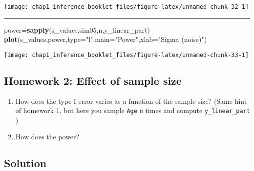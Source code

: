 \documentclass[]{article}
\newenvironment{Shaded}{\begin{snugshade}}{\end{snugshade}}
\newcommand{\KeywordTok}[1]{\textcolor[rgb]{0.13,0.29,0.53}{\textbf{#1}}}
\newcommand{\DataTypeTok}[1]{\textcolor[rgb]{0.13,0.29,0.53}{#1}}
\newcommand{\StringTok}[1]{\textcolor[rgb]{0.31,0.60,0.02}{#1}}
\newcommand{\NormalTok}[1]{#1}
\begin{document}
\begin{center}\texttt{[image: chap1\_inference\_booklet\_files/figure-latex/unnamed-chunk-32-1]} \end{center}

\begin{center}\rule{0.5\linewidth}{\linethickness}\end{center}

\begin{Shaded}
\begin{Highlighting}[]
\NormalTok{power=}\KeywordTok{sapply}\NormalTok{(s_values,sim05,n,y_linear_part)}
\KeywordTok{plot}\NormalTok{(s_values,power,}\DataTypeTok{type=}\StringTok{"l"}\NormalTok{,}\DataTypeTok{main=}\StringTok{"Power"}\NormalTok{,}\DataTypeTok{xlab=}\StringTok{"Sigma (noise)"}\NormalTok{)}
\end{Highlighting}
\end{Shaded}

\begin{center}\texttt{[image: chap1\_inference\_booklet\_files/figure-latex/unnamed-chunk-33-1]} \end{center}

\subsection{Homework 2: Effect of sample
size}\label{homework-2-effect-of-sample-size}

\begin{enumerate}
\def\labelenumi{\arabic{enumi}.}
\item
  How does the type I error varies as a function of the sample size?
  (Same hint of homework 1, but here you sample \texttt{Age} \texttt{n}
  times and compute \texttt{y\_linear\_part} )
\item
  How does the power?
\end{enumerate}

\subsection{Solution}\label{solution-1}
\end{document}
